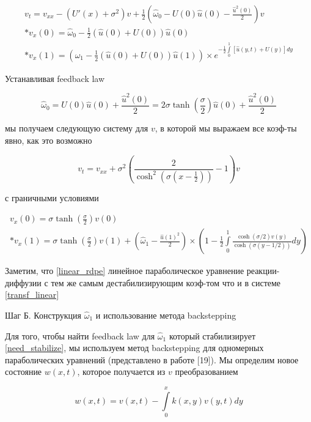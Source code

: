 \begin{gather}
  v_t = v_{xx} - (U'(x) + \sigma^2)v + \frac{1}{2}(\hat{\omega}_0 - U(0)\hat{u}(0) - \frac{\hat{u}^2(0)}{2})v \\* 
  v_x(0) = \hat{\omega}_0 - \frac{1}{2}(\hat{u}(0) + U(0))\hat{u}(0) \\*
  v_x(1) = (\hat{\omega}_1 - \frac{1}{2}(\hat{u}(0) + U(0))\hat{u}(1)) \times e^{-\frac{1}{2}\int\limits_0^1{[\hat{u}(y, t) + U(y)] dy}}
\end{gather}

Устанавливая feedback law

\begin{equation}
  \hat{\omega}_0 = U(0)\hat{u}(0) + \frac{\hat{u}^2(0)}{2} = 2\sigma\tanh(\frac{\sigma}{2})\hat{u}(0) + \frac{\hat{u}^2(0)}{2}
\end{equation}

мы получаем следующую систему для $v$, в которой мы выражаем все коэф-ты явно, как это возможно

\begin{equation}\label{linear_rdpe}
  v_t = v_{xx} + \sigma^2(\frac{2}{\cosh^2(\sigma(x - \frac{1}{2}))} - 1)v
\end{equation}

с граничными условиями

\begin{gather} \label{need_stabilize}
  v_x(0) = \sigma\tanh(\frac{\sigma}{2})v(0) \\*
  v_x(1) = \sigma\tanh(\frac{\sigma}{2})v(1) + (\hat{\omega}_1 - \frac{\hat{u}(1)^2}{2}) \times (1 - \frac{1}{2}\int\limits_0^1{\frac{\cosh(\sigma/2)v(y)}{\cosh(\sigma(y - 1/2))} dy})
\end{gather}

Заметим, что \eqref{linear_rdpe} линейное параболическое уравнение реакции-диффузии с тем же самым дестабилизирующим коэф-том что и в системе \eqref{transf_linear}



Шаг Б. Конструкция $\hat{\omega}_1$ и использование метода backstepping

Для того, чтобы найти feedback law для $\hat{\omega}_1$ который стабилизирует \eqref{need_stabilize}, мы используем метод backstepping для одномерных параболических уравнений (представлено в работе [19]). Мы определим новое состояние $w(x, t)$, которое получается из $v$ преобразованием

\begin{equation}
  w(x, t) = v(x, t) - \int\limits_0^x{k(x, y)v(y, t)dy}
\end{equation}

